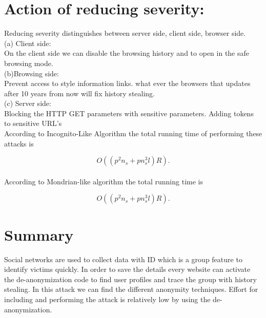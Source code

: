 \documentclass[14pt letter paper]{article}
\begin{document}
 \section{Action of reducing severity:}
 Reducing severity distinguishes between server side, client side, browser side.
 \\(a) Client side: \\ On the client side we can disable the browsing history and to open in the safe browsing mode.
 \\ (b)Browsing side: \\ Prevent access to style information links. what ever the browsers that updates after 10 years from now will fix history stealing.
 \\ (c) Server side: \\ Blocking the HTTP GET parameters with sensitive parameters. Adding tokens to sensitive URL's
 \\According to Incognito-Like Algorithm the total running time of performing these attacks is 

 \begin{equation}
O((p^2n_s + pn^3_s l)R).
\end{equation}
\\ According to Mondrian-like algorithm the total running time is 

\begin{equation}
O((p^2n_s + pn^3_s l)R).
\end{equation}

\section{Summary} Social networks are used to collect data with ID which is a group feature to identify victims quickly. In order to save the details every website can activate the de-anonymization code to find user profiles and trace the group with history stealing. In this attack we can find the different anonymity techniques. Effort for including and performing the attack is relatively low by using the de-anonymization.
\end{document}
